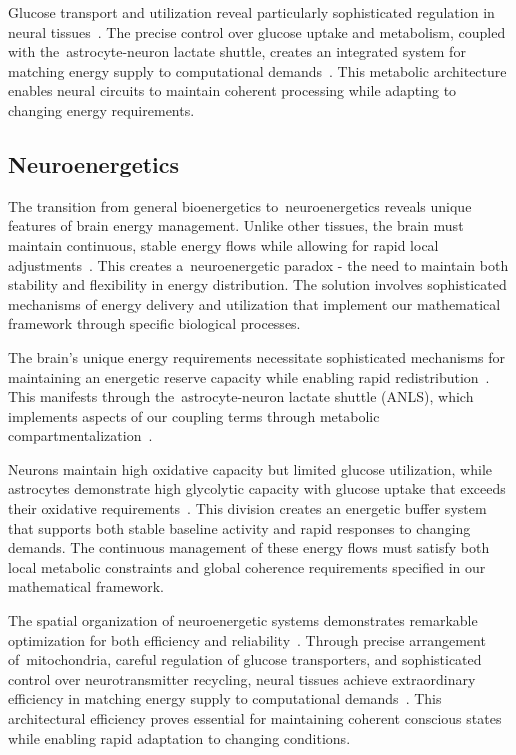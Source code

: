 Glucose transport and utilization reveal particularly sophisticated regulation in neural tissues~\cite{Szablewski2017, Magistretti2015}. The precise control over glucose uptake and metabolism, coupled with the~astrocyte-neuron lactate shuttle, creates an integrated system for matching energy supply to computational demands~\cite{Pellerin2012}. This metabolic architecture enables neural circuits to maintain coherent processing while adapting to changing energy requirements.

\subsection*{Neuroenergetics}

The transition from general bioenergetics to~neuroenergetics reveals unique features of brain energy management. Unlike other tissues, the brain must maintain continuous, stable energy flows while allowing for rapid local adjustments~\cite{DiNuzzo2017, haier1988cortical}. This creates a~neuroenergetic paradox - the need to maintain both stability and flexibility in energy distribution. The solution involves sophisticated mechanisms of energy delivery and utilization that implement our mathematical framework through specific biological processes.

The brain's unique energy requirements necessitate sophisticated mechanisms for maintaining an energetic reserve capacity while enabling rapid redistribution~\cite{bejan2011constructal}. This manifests through the~astrocyte-neuron lactate shuttle (ANLS), which implements aspects of our coupling terms through metabolic compartmentalization~\cite{Pellerin2012, Magistretti2015}.

Neurons maintain high oxidative capacity but limited glucose utilization, while astrocytes demonstrate high glycolytic capacity with glucose uptake that exceeds their oxidative requirements~\cite{Magistretti2015, pellerin2004neuroenergetics}. This division creates an energetic buffer system that supports both stable baseline activity and rapid responses to changing demands. The continuous management of these energy flows must satisfy both local metabolic constraints and global coherence requirements specified in our mathematical framework.

The spatial organization of neuroenergetic systems demonstrates remarkable optimization for both efficiency and reliability~\cite{Attwell2001, bullmore2012economy}. Through precise arrangement of~mitochondria, careful regulation of glucose transporters, and sophisticated control over neurotransmitter recycling, neural tissues achieve extraordinary efficiency in matching energy supply to computational demands~\cite{Harris2012}. This architectural efficiency proves essential for maintaining coherent conscious states while enabling rapid adaptation to changing conditions.

